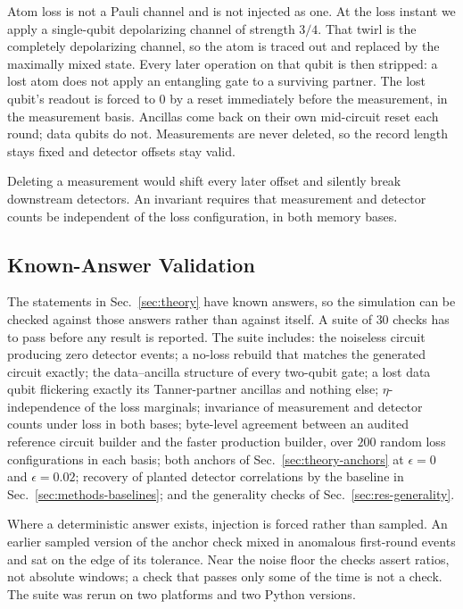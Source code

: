 \documentclass{ieeeaccess}
\begin{document}
Atom loss is not a Pauli channel and is not injected as one. At the loss
instant we apply a single-qubit depolarizing channel of strength $3/4$. That
twirl is the completely depolarizing channel, so the atom is traced out and
replaced by the maximally mixed state. Every later operation on that qubit is
then stripped: a lost atom does not apply an entangling gate to a surviving
partner. The lost qubit's readout is forced to $0$ by a reset immediately
before the measurement, in the measurement basis. Ancillas come back on their
own mid-circuit reset each round; data qubits do not. Measurements are never
deleted, so the record length stays fixed and detector offsets stay valid.

Deleting a measurement would shift every later offset and silently break
downstream detectors. An invariant requires that measurement and detector
counts be independent of the loss configuration, in both memory bases.

\subsection{Known-Answer Validation}
\label{sec:methods-checks}

The statements in Sec.~\ref{sec:theory} have known answers, so the simulation
can be checked against those answers rather than against itself. A suite of
$30$ checks has to pass before any result is reported. The suite includes:
the noiseless circuit producing zero detector events; a no-loss rebuild that
matches the generated circuit exactly; the data--ancilla structure of every
two-qubit gate; a lost data qubit flickering exactly its Tanner-partner
ancillas and nothing else; $\eta$-independence of the loss marginals;
invariance of measurement and detector counts under loss in both bases;
byte-level agreement between an audited reference circuit builder and the
faster production builder, over $200$ random loss configurations in each
basis; both anchors of Sec.~\ref{sec:theory-anchors} at $\epsilon=0$ and
$\epsilon=0.02$; recovery of planted detector correlations by the baseline in
Sec.~\ref{sec:methods-baselines}; and the generality checks of
Sec.~\ref{sec:res-generality}.

Where a deterministic answer exists, injection is forced rather than sampled.
An earlier sampled version of the anchor check mixed in anomalous first-round
events and sat on the edge of its tolerance. Near the noise floor the checks
assert ratios, not absolute windows; a check that passes only some of the time
is not a check. The suite was rerun on two platforms and two Python versions.
\end{document}
